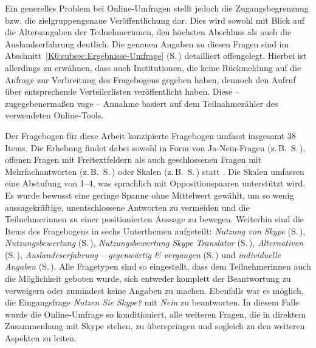 Ein generelles Problem bei Online-Umfragen stellt jedoch die Zugangsbegrenzung bzw. die zielgruppengenaue Veröffentlichung dar. Dies wird sowohl mit Blick auf die Altersangaben der Teilnehmer{\textperiodcentered}innen, den höchsten Abschluss als auch die Auslandserfahrung deutlich. Die genauen Angaben zu diesen Fragen sind im Abschnitt~\ref{K6:subsec:Ergebnisse-Umfrage} (S.\,\pageref{K6:subsec:Ergebnisse-Umfrage}) detailliert offengelegt. Hierbei ist allerdings zu erwähnen, dass auch Institutionen, die keine Rückmeldung auf die Anfrage zur Verbreitung des Fragebogens gegeben haben, dennoch den Aufruf über entsprechende Verteilerlisten veröffentlicht haben. Diese -- zugegebenermaßen vage -- Annahme basiert auf dem Teilnahmezähler des verwendeten Online-Tools.

Der Fragebogen für diese Arbeit konzipierte Fragebogen umfasst insgesamt 38 Items. Die Erhebung findet dabei sowohl in Form von Ja-Nein-Fragen (z.\,B.\ S.\,\pageref{App1:freq}), offenen Fragen mit Freitextfeldern als auch geschlossenen Fragen mit Mehrfachantworten (z.\,B.\ S.\,\pageref{App1:Alt}) oder Skalen (z.\,B.\ S.\,\pageref{App1:NST}) statt \citep[138\psq]{atteslander_methoden_2010}. Die Skalen umfassen eine Abstufung von 1--4, was sprachlich mit Oppositionspaaren unterstützt wird. Es wurde bewusst eine geringe Spanne ohne Mittelwert gewählt, um so wenig aussagekräftige, unentschlossene Antworten zu vermeiden und die Teilnehmer{\textperiodcentered}innen zu einer positionierten Aussage zu bewegen. Weiterhin sind die Items des Fragebogens in sechs Unterthemen aufgeteilt: \emph{Nutzung von Skype} (S.\,\pageref{App1:SectionNutzung}), \emph{Nutzungsbewertung} (S.\,\pageref{App1:SectionNutzungsbewerung}), \emph{Nutzungsbewertung Skype Translator} (S.\,\pageref{App1:SectionNutzungsbewerungST}), \emph{Alternativen} (S.\,\pageref{App1:SectionAlternativen}), \emph{Auslandeserfahrung -- gegenwärtig \& vergangen} (S.\,\pageref{App1:SectionAuslandserfahrung}) und \emph{individuelle Angaben} (S.\,\pageref{App1:SectionDemographie}). Alle Fragetypen sind so eingestellt, dass dem Teilnehmer{\textperiodcentered}innen auch die Möglichkeit geboten wurde, sich entweder komplett der Beantwortung zu verweigern oder zumindest keine Angaben zu machen. Ebenfalls war es möglich, die Eingangsfrage \emph{Nutzen Sie Skype?} mit \emph{Nein} zu beantworten. In diesem Falle wurde die Online-Umfrage so konditioniert, alle weiteren Fragen, die in direktem Zusammenhang mit Skype stehen, zu überspringen und sogleich zu den weiteren Aspekten zu leiten.

